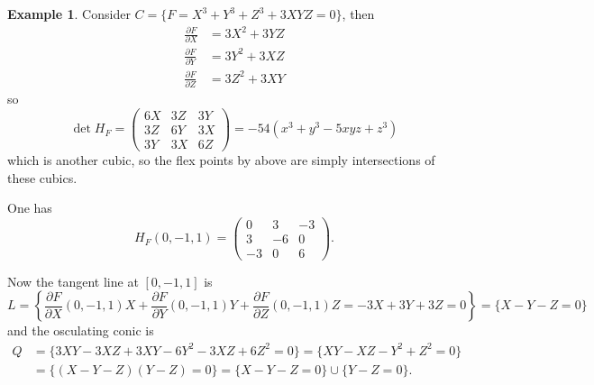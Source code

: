 \documentclass{article}
\theoremstyle{definition}
\newtheorem{example}[defn]{Example}
\begin{document}
\begin{example}
\label{example:Hessianflex}
Consider $C=\{F=X^3+Y^3+Z^3+3XYZ=0\}$, then
\[
\begin{aligned}
\frac{\partial F}{\partial X}&=3X^2+3YZ \\
\frac{\partial F}{\partial Y}&=3Y^2+3XZ \\
\frac{\partial F}{\partial Z}&=3Z^2+3XY
\end{aligned}
\]
so
\[
\det H_F=\begin{pmatrix}
6X & 3Z & 3Y \\ 3Z & 6Y & 3X \\ 3Y & 3X & 6Z
\end{pmatrix}=-54 (x^3 + y^3 - 5xyz + z^3)
\]
which is another cubic, so the flex points by above are simply intersections of these cubics.

\begin{center}
\end{center}

One has
\[
H_F(0,-1,1)=\begin{pmatrix}0 & 3 & -3 \\ 3 & -6 & 0 \\ -3 & 0 & 6\end{pmatrix}.
\]

Now the tangent line at $[0,-1,1]$ is
\[
L=\left\{\frac{\partial F}{\partial X}(0,-1,1)X+\frac{\partial F}{\partial Y}(0,-1,1)Y+\frac{\partial F}{\partial Z}(0,-1,1)Z=-3X+3Y+3Z=0\right\}=\{X-Y-Z=0\}
\]
and the osculating conic is
\[
\begin{aligned}
Q&=\{3XY-3XZ+3XY-6Y^2-3XZ+6Z^2=0\}=\{XY-XZ-Y^2+Z^2=0\}\\&=\{(X-Y-Z)(Y-Z)=0\}=\{X-Y-Z=0\}\cup\{Y-Z=0\}.
\end{aligned}
\]
\end{example}
\end{document}
